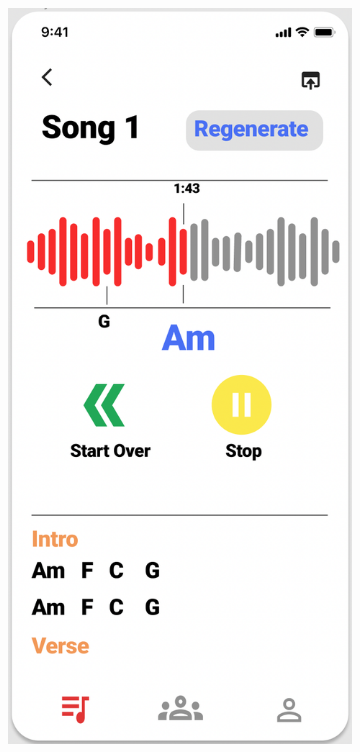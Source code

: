 \begin{figure}[ht]
     \centering
     \hspace{16mm}
     \begin{subfigure}[b]{0.2\textwidth}
         \centering
         \includegraphics[width=\textwidth]{Figures/grappp}

\end{subfigure}
\end{figure}
